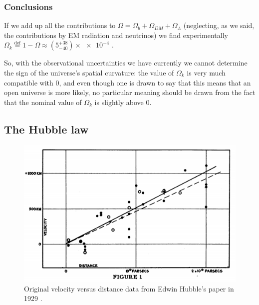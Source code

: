 \documentclass[main.tex]{subfiles}
\begin{document}
\subsubsection{Conclusions} \label{sec:global-omega-contributions}

If we add up all the contributions to  \(\Omega = \Omega_b + \Omega_{DM} + \Omega_{\Lambda }\) (neglecting, as we said, the contributions by EM radiation and neutrinos) we find experimentally \(\Omega_{k} \overset{\text{def}}{=} 1- \Omega  \approx (5^{+38}_{-40}) \times  \num{e-4}\) \cite[Table A.2]{planckcollaborationPlanck2018Results2019a}.

So, with the observational uncertainties we have currently we cannot determine the sign of the universe's spatial curvature: the value of \(\Omega_{k}\) is very much compatible with \(0 \), and even though one is drawn to say that this means that an open universe is more likely, no particular meaning should be drawn from the fact that the nominal value of \(\Omega_{k}\) is slightly above 0.

\subsection{The Hubble law}

\begin{figure}[ht]
\centering
\includegraphics[width=\textwidth]{figures/hubble_original.png}
\caption{Original velocity versus distance data from Edwin Hubble's paper in 1929 \cite{hubbleedwinRelationDistanceRadial1929}.}
\label{fig:hubble_original}
\end{figure}
\end{document}
